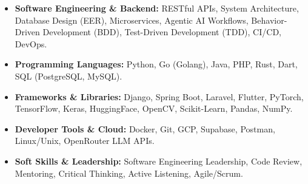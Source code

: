 \documentclass[letterpaper,10pt]{article}
\begin{document}
\begin{itemize}[leftmargin=0.18in, itemsep=1.5pt]
    \item \textbf{Software Engineering \& Backend:} RESTful APIs, System Architecture, Database Design (EER), Microservices, Agentic AI Workflows, Behavior-Driven Development (BDD), Test-Driven Development (TDD), CI/CD, DevOps.
    \item \textbf{Programming Languages:} Python, Go (Golang), Java, PHP, Rust, Dart, SQL (PostgreSQL, MySQL).
    \item \textbf{Frameworks \& Libraries:} Django, Spring Boot, Laravel, Flutter, PyTorch, TensorFlow, Keras, HuggingFace, OpenCV, Scikit-Learn, Pandas, NumPy.
    \item \textbf{Developer Tools \& Cloud:} Docker, Git, GCP, Supabase, Postman, Linux/Unix, OpenRouter LLM APIs.
    \item \textbf{Soft Skills \& Leadership:} Software Engineering Leadership, Code Review, Mentoring, Critical Thinking, Active Listening, Agile/Scrum.
\end{itemize}
\end{document}
